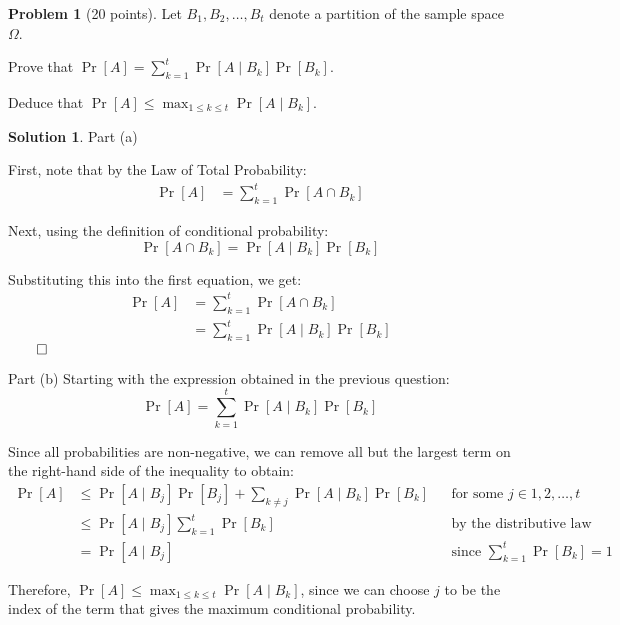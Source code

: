 \documentclass{article}
\theoremstyle{definition}
\newtheorem{problem}{Problem}
\newtheorem*{solution}{Solution}
\begin{document}
\clearpage
\begin{problem}[20 points] 
Let $B_1, B_2, \ldots, B_t$ denote a partition of the sample space
$\Omega$. 
\begin{compactenum}[(a)]
\item Prove that $\Pr[A] = \sum_{k=1}^t \Pr[A\mid B_k] \Pr[B_k]$. 
\item Deduce that $\Pr[A] \le \max_{1\le k\le t} \Pr[A \mid B_k].$
\end{compactenum}
\end{problem}
\begin{solution}
Part (a)

\noindent
First, note that by the Law of Total Probability:
\begin{align*}
\Pr[A] &= \sum_{k=1}^t \Pr[A \cap B_k]
\end{align*}

\noindent
Next, using the definition of conditional probability:
\[\Pr[A\cap B_k]=\Pr[A\mid B_k]\Pr[B_k]\]

\noindent
Substituting this into the first equation, we get:
\begin{align*}
\Pr[A]  &= \sum_{k=1}^t \Pr[A \cap B_k]\ \\
        &= \sum_{k=1}^t \Pr[A \mid B_k] \Pr[B_k]
\end{align*}
$\qed$

\noindent
Part (b)
Starting with the expression obtained in the previous question:
\[\Pr[A] = \sum_{k=1}^t\Pr[A\mid B_k]\Pr[B_k]\]

\noindent
Since all probabilities are non-negative, we can remove all but the largest term on the right-hand side of the inequality to obtain:
\begin{align*}
\Pr[A] &\leq \Pr[A \mid B_j] \Pr[B_j] + \sum_{k \neq j} \Pr[A \mid B_k] \Pr[B_k] &&\text{for some }j \in {1, 2, \ldots, t}\\
&\leq \Pr[A \mid B_j] \sum_{k=1}^t \Pr[B_k] &&\text{by the distributive law}\\
&= \Pr[A \mid B_j] &&\text{since }\sum_{k=1}^t \Pr[B_k] = 1
\end{align*}

\noindent
Therefore, $\Pr[A]\leq\max_{1\leq k\leq t}\Pr[A\mid B_k]$, since we can choose $j$ to be the index of the term that gives the maximum conditional probability.
\end{solution}
\end{document}
